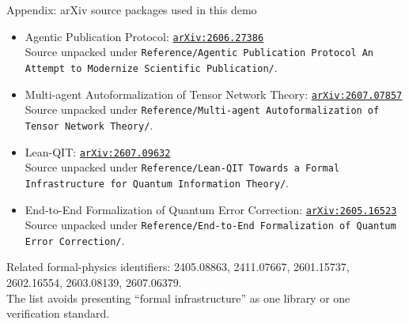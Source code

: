 \documentclass[aspectratio=169]{beamer}
\begin{document}
\begin{frame}{Appendix: arXiv source packages used in this demo}
  \small
  \begin{itemize}\setlength{\itemsep}{0.35em}
    \item Agentic Publication Protocol: \href{https://arxiv.org/abs/2606.27386}{\texttt{arXiv:2606.27386}}\\[-0.1em]
      \scriptsize Source unpacked under \texttt{Reference/Agentic Publication Protocol An Attempt to Modernize Scientific Publication/}.
    \item Multi-agent Autoformalization of Tensor Network Theory: \href{https://arxiv.org/abs/2607.07857}{\texttt{arXiv:2607.07857}}\\[-0.1em]
      \scriptsize Source unpacked under \texttt{Reference/Multi-agent Autoformalization of Tensor Network Theory/}.
    \item Lean-QIT: \href{https://arxiv.org/abs/2607.09632}{\texttt{arXiv:2607.09632}}\\[-0.1em]
      \scriptsize Source unpacked under \texttt{Reference/Lean-QIT Towards a Formal Infrastructure for Quantum Information Theory/}.
    \item End-to-End Formalization of Quantum Error Correction: \href{https://arxiv.org/abs/2605.16523}{\texttt{arXiv:2605.16523}}\\[-0.1em]
      \scriptsize Source unpacked under \texttt{Reference/End-to-End Formalization of Quantum Error Correction/}.
  \end{itemize}
  \vspace{0.5em}
  \scriptsize Related formal-physics identifiers: 2405.08863, 2411.07667, 2601.15737, 2602.16554, 2603.08139, 2607.06379.\\The list avoids presenting ``formal infrastructure'' as one library or one verification standard.
\end{frame}
\end{document}

